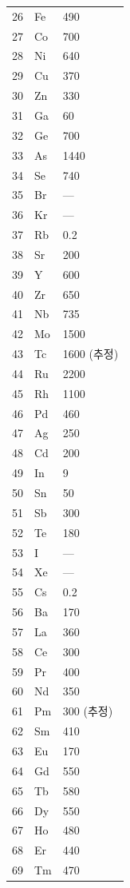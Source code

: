 \documentclass[12pt,a4paper]{article}
\begin{document}
\begin{longtable}{p{0.6cm}p{1.2cm}p{2.5cm}}
		26 & Fe & 490 \\
		27 & Co & 700 \\
		28 & Ni & 640 \\
		29 & Cu & 370 \\
		30 & Zn & 330 \\
		31 & Ga & 60 \\
		32 & Ge & 700 \\
		33 & As & 1440 \\
		34 & Se & 740 \\
		35 & Br & — \\
		36 & Kr & — \\
		37 & Rb & 0.2 \\
		38 & Sr & 200 \\
		39 & Y  & 600 \\
		40 & Zr & 650 \\
		41 & Nb & 735 \\
		42 & Mo & 1500 \\
		43 & Tc & 1600 (추정) \\
		44 & Ru & 2200 \\
		45 & Rh & 1100 \\
		46 & Pd & 460 \\
		47 & Ag & 250 \\
		48 & Cd & 200 \\
		49 & In & 9 \\
		50 & Sn & 50 \\
		51 & Sb & 300 \\
		52 & Te & 180 \\
		53 & I  & — \\
		54 & Xe & — \\
		55 & Cs & 0.2 \\
		56 & Ba & 170 \\
		57 & La & 360 \\
		58 & Ce & 300 \\
		59 & Pr & 400 \\
		60 & Nd & 350 \\
		61 & Pm & 300 (추정) \\
		62 & Sm & 410 \\
		63 & Eu & 170 \\
		64 & Gd & 550 \\
		65 & Tb & 580 \\
		66 & Dy & 550 \\
		67 & Ho & 480 \\
		68 & Er & 440 \\
		69 & Tm & 470 \\

\end{longtable}
\end{document}
